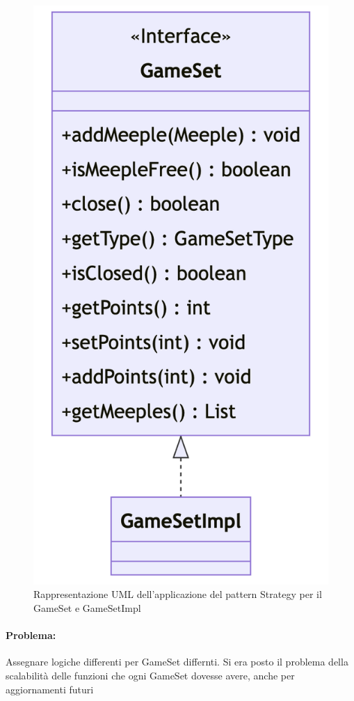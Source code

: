 \begin{figure}[ht]
    \centering\includegraphics[scale=.4]{images/gameset.png}
    \caption{Rappresentazione UML dell'applicazione del pattern Strategy per il GameSet e GameSetImpl}
\end{figure}
\paragraph{Problema:}
Assegnare logiche differenti per GameSet differnti. Si era posto il problema della scalabilità delle funzioni che ogni GameSet dovesse avere, anche per aggiornamenti futuri
